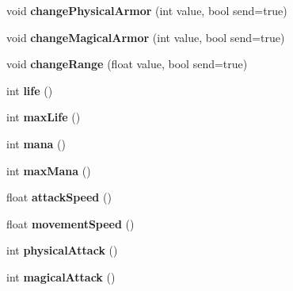 \begin{DoxyCompactItemize}
\item 
\hypertarget{class_player_stat_af6be76ca6371806cc3454097665fd2f9}{void {\bfseries change\-Physical\-Armor} (int value, bool send=true)}\label{class_player_stat_af6be76ca6371806cc3454097665fd2f9}

\item 
\hypertarget{class_player_stat_a4403b8dce471b20a79231cce4a185eab}{void {\bfseries change\-Magical\-Armor} (int value, bool send=true)}\label{class_player_stat_a4403b8dce471b20a79231cce4a185eab}

\item 
\hypertarget{class_player_stat_aa6aede91290da45f7f1131054fa8bcfc}{void {\bfseries change\-Range} (float value, bool send=true)}\label{class_player_stat_aa6aede91290da45f7f1131054fa8bcfc}

\item 
\hypertarget{class_player_stat_a4a24c014809424c9e8a64dbd3bc0de6d}{int {\bfseries life} ()}\label{class_player_stat_a4a24c014809424c9e8a64dbd3bc0de6d}

\item 
\hypertarget{class_player_stat_ab0f93947a0c204ca0b3043035cb48d85}{int {\bfseries max\-Life} ()}\label{class_player_stat_ab0f93947a0c204ca0b3043035cb48d85}

\item 
\hypertarget{class_player_stat_a1599b4d7829e21186a15781fba507963}{int {\bfseries mana} ()}\label{class_player_stat_a1599b4d7829e21186a15781fba507963}

\item 
\hypertarget{class_player_stat_ad443ce2b903acc591ef866cd9dfa5e1f}{int {\bfseries max\-Mana} ()}\label{class_player_stat_ad443ce2b903acc591ef866cd9dfa5e1f}

\item 
\hypertarget{class_player_stat_a90d7dab8c21a4ca43d28f1f27d02cec3}{float {\bfseries attack\-Speed} ()}\label{class_player_stat_a90d7dab8c21a4ca43d28f1f27d02cec3}

\item 
\hypertarget{class_player_stat_a66bae7b4a2c8ba99b930892e47a19fb4}{float {\bfseries movement\-Speed} ()}\label{class_player_stat_a66bae7b4a2c8ba99b930892e47a19fb4}

\item 
\hypertarget{class_player_stat_a23c5121333f4ef82fa7552cfff2a6063}{int {\bfseries physical\-Attack} ()}\label{class_player_stat_a23c5121333f4ef82fa7552cfff2a6063}

\item 
\hypertarget{class_player_stat_a729d3f256d5c85e682106cd71c1ecf6b}{int {\bfseries magical\-Attack} ()}\label{class_player_stat_a729d3f256d5c85e682106cd71c1ecf6b}


\end{DoxyCompactItemize}

